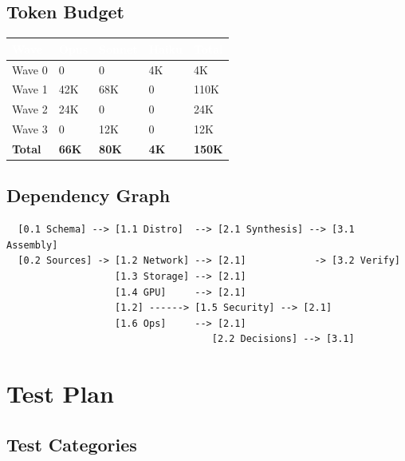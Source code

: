 \documentclass[11pt,letterpaper]{article}
\newcommand{\tableheader}[1]{\textbf{\sffamily\textcolor{white}{#1}}}
\begin{document}
\subsection{Token Budget}

\begin{center}
\begin{tabularx}{\textwidth}{L{3cm}C{2cm}C{2cm}C{2cm}C{2cm}}
\toprule
{}
\tableheader{Wave} & \tableheader{Opus} & \tableheader{Sonnet} & \tableheader{Haiku} & \tableheader{Total} \\
\midrule
Wave 0 & 0 & 0 & 4K & 4K \\
Wave 1 & 42K & 68K & 0 & 110K \\
Wave 2 & 24K & 0 & 0 & 24K \\
Wave 3 & 0 & 12K & 0 & 12K \\
\midrule
\textbf{Total} & \textbf{66K} & \textbf{80K} & \textbf{4K} & \textbf{150K} \\
\bottomrule
\end{tabularx}
\end{center}

\subsection{Dependency Graph}

\begin{asciibox}
\begin{verbatim}
  [0.1 Schema] --> [1.1 Distro]  --> [2.1 Synthesis] --> [3.1 Assembly]
  [0.2 Sources] -> [1.2 Network] --> [2.1]            -> [3.2 Verify]
                   [1.3 Storage] --> [2.1]
                   [1.4 GPU]     --> [2.1]
                   [1.2] ------> [1.5 Security] --> [2.1]
                   [1.6 Ops]     --> [2.1]
                                    [2.2 Decisions] --> [3.1]
\end{verbatim}
\end{asciibox}

\section{Test Plan}

\subsection{Test Categories}
\end{document}
